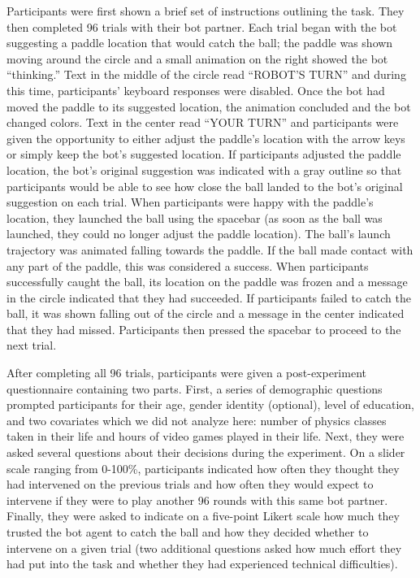 \documentclass[10pt,letterpaper]{article}
\begin{document}
Participants were first shown a brief set of instructions outlining the task. They then completed 96 trials with their bot partner. Each trial began with the bot suggesting a paddle location that would catch the ball; the paddle was shown moving around the circle and a small animation on the right showed the bot ``thinking.'' Text in the middle of the circle read ``ROBOT'S TURN'' and during this time, participants' keyboard responses were disabled. Once the bot had moved the paddle to its suggested location, the animation concluded and the bot changed colors. Text in the center read ``YOUR TURN'' and participants were given the opportunity to either adjust the paddle's location with the arrow keys or simply keep the bot's suggested location. If participants adjusted the paddle location, the bot's original suggestion was indicated with a gray outline so that participants would be able to see how close the ball landed to the bot's original suggestion on each trial. When participants were happy with the paddle's location, they launched the ball using the spacebar (as soon as the ball was launched, they could no longer adjust the paddle location). The ball's launch trajectory was animated falling towards the paddle. If the ball made contact with any part of the paddle, this was considered a success. When participants successfully caught the ball, its location on the paddle was frozen and a message in the circle indicated that they had succeeded. If participants failed to catch the ball, it was shown falling out of the circle and a message in the center indicated that they had missed. Participants then pressed the spacebar to proceed to the next trial. 

After completing all 96 trials, participants were given a post-experiment questionnaire containing two parts. First, a series of demographic questions prompted participants for their age, gender identity (optional), level of education, and two covariates which we did not analyze here: number of physics classes taken in their life and hours of video games played in their life. Next, they were asked several questions about their decisions during the experiment. On a slider scale ranging from 0-100\%, participants indicated how often they thought they had intervened on the previous trials and how often they would expect to intervene if they were to play another 96 rounds with this same bot partner. Finally, they were asked to indicate on a five-point Likert scale how much they trusted the bot agent to catch the ball and how they decided whether to intervene on a given trial (two additional questions asked how much effort they had put into the task and whether they had experienced technical difficulties). 
\end{document}
